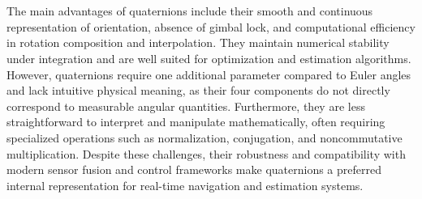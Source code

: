 \\ \\
The main advantages of quaternions include their smooth and continuous representation of orientation, absence of gimbal lock, and computational efficiency in rotation composition and interpolation. They maintain numerical stability under integration and are well suited for optimization and estimation algorithms. However, quaternions require one additional parameter compared to Euler angles and lack intuitive physical meaning, as their four components do not directly correspond to measurable angular quantities. Furthermore, they are less straightforward to interpret and manipulate mathematically, often requiring specialized operations such as normalization, conjugation, and noncommutative multiplication. Despite these challenges, their robustness and compatibility with modern sensor fusion and control frameworks make quaternions a preferred internal representation for real-time navigation and estimation systems.



\newpage



